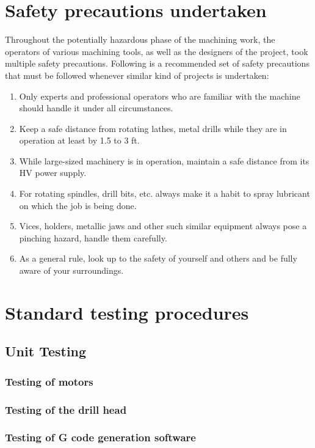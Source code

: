\section{Safety precautions undertaken}

Throughout the potentially hazardous phase of the machining work, the operators of various machining tools, as well as the designers of the project, took multiple safety precautions. Following is a recommended set of safety precautions that must be followed whenever similar kind of projects is undertaken:

\begin{enumerate}
    \item Only experts and professional operators who are familiar with the machine should handle it under all circumstances.
    \item Keep a safe distance from rotating lathes, metal drills while they are in operation at least by 1.5 to 3 ft.
    \item While large-sized machinery is in operation, maintain a safe distance from its HV power supply.
    \item For rotating spindles, drill bits, etc. always make it a habit to spray lubricant on which the job is being done.
    \item Vices, holders, metallic jaws and other such similar equipment always pose a pinching hazard, handle them carefully.
    \item As a general rule, look up to the safety of yourself and others and be fully aware of your surroundings.
\end{enumerate}

\section{Standard testing procedures}

\subsection{Unit Testing}

\subsubsection*{Testing of motors}
\subsubsection*{Testing of the drill head}
\subsubsection*{Testing of G code generation software}

